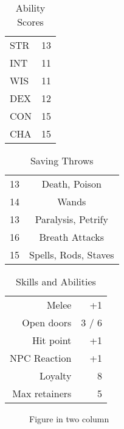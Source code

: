 \documentclass[a4paper]{article}
\begin{document}
\begin{multicols}{2}
\lipsum[1-3]
\begin{table}[H]
  \begin{center}
    \caption*{Ability Scores}
    \begin{tabular}{l|r} %
      STR & 13\\
      INT & 11\\
      WIS & 11\\
      DEX & 12\\
      CON & 15\\
      CHA & 15\\
    \end{tabular}
  \end{center}
\end{table}
\lipsum[3-4]
\begin{table}[H]
  \begin{center}
    \caption*{Saving Throws}
    \begin{tabular}{l|c} %
      13 & Death, Poison\\
      14 & Wands\\
      13 & Paralysis, Petrify\\
      16 & Breath Attacks\\
      15 & Spells, Rods, Staves\\
    \end{tabular}
  \end{center}
\end{table}
\begin{table}[H]
  \begin{center}
    \caption*{Skills and Abilities}
    \begin{tabular}{r|r} %
      Melee & +1\\
      Open doors & 3 / 6\\
      Hit point & +1\\
      NPC Reaction & +1\\
      Loyalty & 8\\
      Max retainers & 5\\
    \end{tabular}
  \end{center}
\end{table}
\begin{figure}[H]
  \centering
  \caption{Figure in two column}
\end{figure}
\lipsum[5-6]
\end{multicols}
\end{document}
